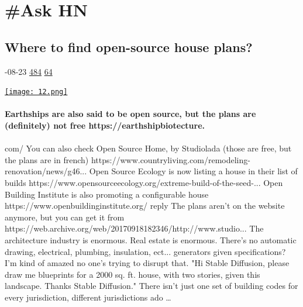 \documentclass[10pt,a4paper]{article}
\begin{document}
\section{\#Ask HN}

\begin{multicols}{2}
\raggedcolumns
\noindent\begin{minipage}{\linewidth}
\medskip
\subsection{Where to find open-source house plans?}
\textsc{\footnotesize
{\scriptsize\faCalendar}-08-23 
{\scriptsize\faThumbsOUp}\space 
\href{}{484} 
{\scriptsize\faComments}\space 
\href{}{64} 
}
\par\medskip\noindent
\href{https://news.ycombinator.com/item?id=37234111\&utm\_source=hackernewsletter\&utm\_medium=email\&utm\_term=ask\_hn}{
    \texttt{[image: 12.png]}
}
\end{minipage}
\paragraph{}
\textbf{Earthships are also said to be open source, but the plans are (definitely) not free
https://earthshipbiotecture.}
\paragraph{}
com/
You can also check Open Source Home, by Studiolada (those are free, but the plans are in french)
https://www.countryliving.com/remodeling-renovation/news/g46...
Open Source Ecology is now listing a house in their list of builds
https://www.opensourceecology.org/extreme-build-of-the-seed-...
Open Building Institute is also promoting a configurable house
https://www.openbuildinginstitute.org/
reply
The plans aren't on the website anymore, but you can get it from https://web.archive.org/web/20170918182346/http://www.studio...
The architecture industry is enormous. Real estate is enormous. There's no automatic drawing, electrical, plumbing, insulation, ect... generators given specifications? I'm kind of amazed no one's trying to disrupt that. "Hi Stable Diffusion, please draw me blueprints for a 2000 sq. ft. house, with two stories, given this landscape. Thanks Stable Diffusion."
There isn’t just one set of building codes for every jurisdiction, different jurisdictions ado
\dots\par
\noindent\begin{minipage}{\linewidth}
\medskip

\end{minipage}
\end{multicols}
\end{document}
